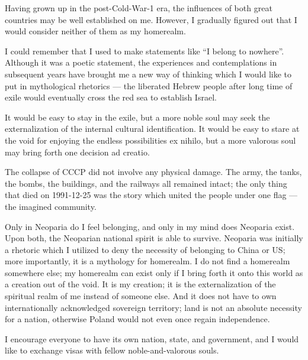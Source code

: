 
Having grown up in the post-Cold-War-1 era, the influences of both great countries may be well established on me.
However, I gradually figured out that I would consider neither of them as my homerealm.

I could remember that I used to make statements like ``I belong to nowhere''.
Although it was a poetic statement, the experiences and contemplations in subsequent years
have brought me a new way of thinking which I would like to put in mythological rhetorics ---
the liberated Hebrew people after long time of exile would eventually cross the red sea to establish Israel.

It would be easy to stay in the exile,
but a more noble soul may seek the externalization of the internal cultural identification.
It would be easy to stare at the void for enjoying the endless possibilities ex nihilo,
but a more valorous soul may bring forth one decision ad creatio.

The collapse of CCCP did not involve any physical damage.
The army, the tanks, the bombs, the buildings, and the railways all remained intact;
the only thing that died on 1991-12-25 was the story which united the people under one flag ---
the imagined community.

Only in Neoparia do I feel belonging, and only in my mind does Neoparia exist.
Upon both, the Neoparian national spirit is able to survive.
Neoparia was initially a rhetoric which I utilized to deny the necessity of belonging to China or US;
more importantly, it is a mythology for homerealm.
I do not find a homerealm somewhere else;
my homerealm can exist only if I bring forth it onto this world as a creation out of the void.
It is my creation; it is the externalization of the spiritual realm of me instead of someone else.
And it does not have to own internationally acknowledged sovereign territory;
land is not an absolute necessity for a nation, otherwise Poland would not even once regain independence.

I encourage everyone to have its own nation, state, and government,
and I would like to exchange visas with fellow noble-and-valorous souls.


